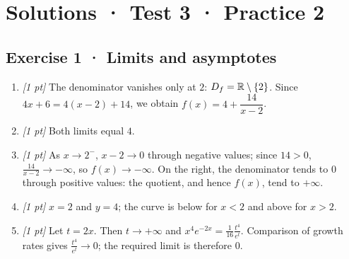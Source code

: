 \ifprof\clearpage

\section*{Solutions · Test 3 · Practice 2}\label{cor:4-2}

\subsection*{Exercise 1 · Limits and asymptotes}\begin{enumerate}

\item \textit{[1 pt]} The denominator vanishes only at $2$: $D_f=\mathbb R\setminus\{2\}$. Since $4x+6=4(x-2)+14$, we obtain $f(x)=4+\dfrac{14}{x-2}$.

\item \textit{[1 pt]} Both limits equal $4$.

\item \textit{[1 pt]} As $x\to 2^-$, $x-2\to0$ through negative values; since $14>0$, $\frac{14}{x-2}\to-\infty$, so $f(x)\to-\infty$. On the right, the denominator tends to $0$ through positive values: the quotient, and hence $f(x)$, tend to $+\infty$.

\item \textit{[1 pt]} $x=2$ and $y=4$; the curve is below for $x<2$ and above for $x>2$.

\item \textit{[1 pt]} Let $t=2x$. Then $t\to+\infty$ and $x^4e^{-2x}=\frac{1}{16}\frac{t^4}{e^t}$. Comparison of growth rates gives $\frac{t^4}{e^t}\to0$; the required limit is therefore $0$.

\end{enumerate}

